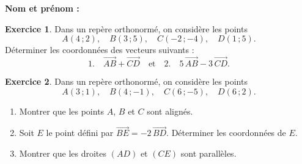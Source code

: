 \documentclass{article}
\theoremstyle{definition}
\newtheorem{exercice}{Exercice}
\begin{document}
\pagestyle{fancy}

\fancyhf{} %
\fancyhead[L]{\large \textbf{\Niveau}}
\fancyhead[C]{\large \textbf{\ChapitreCourt}}

\large

\textbf{Nom et prénom :}\enspace\dotfill
\begin{exercice}
  Dans un repère orthonormé, on considère les points
  \[
    A(4\,;2),\quad
    B(3\,;5),\quad
    C(-2\,;-4),\quad
    D(1\,;5).
  \]
  Déterminer les coordonnées des vecteurs suivants :
  \[
    1.\quad \overrightarrow{AB} + \overrightarrow{CD}
    \quad\text{et}\quad
    2.\quad 5\,\overrightarrow{AB} - 3\,\overrightarrow{CD}.
  \]
  \begin{center}
  \end{center}
\end{exercice}

\begin{exercice}
  Dans un repère orthonormé, on considère les points
  \[
    A(3\,;1),\quad
    B(4\,;-1),\quad
    C(6\,;-5),\quad
    D(6\,;2).
  \]
  \begin{enumerate}
    \item Montrer que les points $A$, $B$ et $C$ sont alignés.
    \item Soit $E$ le point défini par $\overrightarrow{BE} = -2\,\overrightarrow{BD}$. Déterminer les coordonnées de $E$.
    \item Montrer que les droites $(AD)$ et $(CE)$ sont parallèles.
  \end{enumerate}
  \begin{center}
  \end{center}
\end{exercice}
\end{document}
